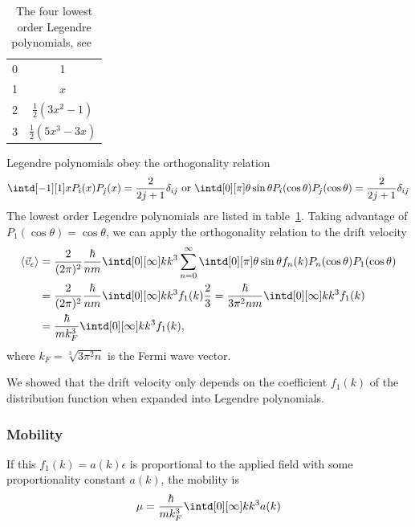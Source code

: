 \documentclass[physics,phd,nolot,nolof]{uccthesis}%
\begin{document}
{\begin{table}
\begin{tabular}{l c  }
    0	&	1	\\
    1	&	$x$	\\
    2	&	$\frac{1}{2}(3x^2 -1)$	\\	
    3	&	$\frac{1}{2}(5x^3 -3x)$	\\	
  \end{tabular}
  \caption{The four lowest order Legendre polynomials, see~\cite{abramowitzstegun72}}
  \label{tab:legendre-polynomials}
\end{table}
Legendre polynomials obey the orthogonality relation\cite{abramowitzstegun72}
\begin{equation}
  \intd[-1][1]x P_i(x) P_j(x) =\frac{2}{2j+1}\delta_{ij} 
  \text{ or }
  \intd[0][\pi]\theta \sin\theta  P_i(\cos\theta) P_j(\cos\theta) =\frac{2}{2j+1}\delta_{ij} 
  \label{eq:legendre-orthogonal}
\end{equation}
The lowest order Legendre polynomials are listed in table~\ref{tab:legendre-polynomials}.
Taking advantage of $P_1(\cos\theta) =\cos\theta$, we can apply the orthogonality
relation to the drift velocity
\begin{equation}
\begin{split}
 \left\langle   \vec v_\epsilon \right \rangle
& = \frac{2 }{(2\pi)^2} \frac{\hbar}{n m}
 \intd[0][\infty]k k^3
 \sum_{n=0}^\infty
 \intd[0][\pi]\theta \sin\theta 
f_n(k) P_n(\cos\theta) P_1(\cos\theta)\\
& = \frac{2 }{(2\pi)^2} \frac{\hbar}{n m}
 \intd[0][\infty]k k^3
 f_1(k) \frac{2}{3}   
 = \frac{\hbar}{3 \pi^2 n  m}
 \intd[0][\infty]k k^3
 f_1(k) \\
& = \frac{\hbar}{m k_F^3}
 \intd[0][\infty]k k^3
 f_1(k), 
\end{split}
  \label{eq:v-average3}
\end{equation}
where $k_F=\sqrt[3]{3\pi^2 n}$ is the Fermi wave vector.

We showed that the drift velocity only depends on the coefficient $f_1(k)$ of the
distribution function when expanded into Legendre polynomials.

\subsubsection{Mobility}
If this $f_1(k)= a(k) \epsilon$ is proportional to the applied field 
with some proportionality constant $a(k)$, 
the mobility is
\begin{equation}
  \mu =  \frac{\hbar}{m k_F^3}\intd[0][\infty]k k^3 a(k) 
  \label{eq:3d-mobility}
\end{equation}

}
\end{document}
